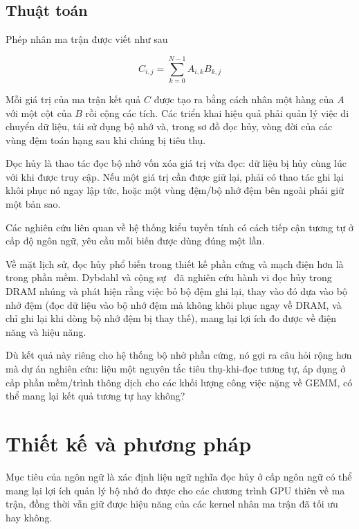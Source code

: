 \documentclass[a4paper]{article}
\begin{document}
	\subsection{Thuật toán}
	
	Phép nhân ma trận được viết như sau
	
	\begin{equation}
		C_{i,j} = \sum_{k=0}^{N-1} A_{i,k}B_{k,j}
	\end{equation}
	
	Mỗi giá trị của ma trận kết quả $C$ được tạo ra bằng cách nhân một hàng của $A$ với một cột của $B$ rồi cộng các tích. Các triển khai hiệu quả phải quản lý việc di chuyển dữ liệu, tái sử dụng bộ nhớ và, trong sơ đồ đọc hủy, vòng đời của các vùng đệm toán hạng sau khi chúng bị tiêu thụ.
	
	Đọc hủy là thao tác đọc bộ nhớ vốn xóa giá trị vừa đọc: dữ liệu bị hủy cùng lúc với khi được truy cập. Nếu một giá trị cần được giữ lại, phải có thao tác ghi lại khôi phục nó ngay lập tức, hoặc một vùng đệm/bộ nhớ đệm bên ngoài phải giữ một bản sao.
	
	Các nghiên cứu liên quan về hệ thống kiểu tuyến tính có cách tiếp cận tương tự ở cấp độ ngôn ngữ, yêu cầu mỗi biến được dùng đúng một lần.
	
	Về mặt lịch sử, đọc hủy phổ biến trong thiết kế phần cứng và mạch điện hơn là trong phần mềm. Dybdahl và cộng sự~\cite{DybdahlKGN06} đã nghiên cứu hành vi đọc hủy trong DRAM nhúng và phát hiện rằng việc bỏ bộ đệm ghi lại, thay vào đó dựa vào bộ nhớ đệm (đọc dữ liệu vào bộ nhớ đệm mà không khôi phục ngay về DRAM, và chỉ ghi lại khi dòng bộ nhớ đệm bị thay thế), mang lại lợi ích đo được về điện năng và hiệu năng. 
	
	Dù kết quả này riêng cho hệ thống bộ nhớ phần cứng, nó gợi ra câu hỏi rộng hơn mà dự án nghiên cứu: liệu một nguyên tắc tiêu thụ-khi-đọc tương tự, áp dụng ở cấp phần mềm/trình thông dịch cho các khối lượng công việc nặng về GEMM, có thể mang lại kết quả tương tự hay không?
	
	
	\section{Thiết kế và phương pháp}
	
	Mục tiêu của ngôn ngữ là xác định liệu ngữ nghĩa đọc hủy ở cấp ngôn ngữ có thể mang lại lợi ích quản lý bộ nhớ đo được cho các chương trình GPU thiên về ma trận, đồng thời vẫn giữ được hiệu năng của các kernel nhân ma trận đã tối ưu hay không.
	
\end{document}
